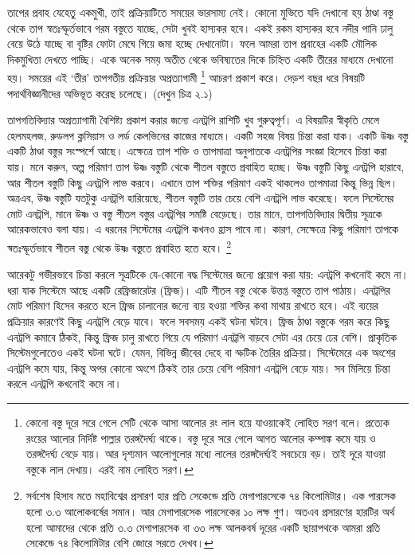 \documentclass[
]{book}
\begin{document}
তাপের প্রবাহ যেহেতু একমুখী, তাই প্রক্রিয়াটিতে সময়ের ভারসাম্য নেই। কোনো মুভিতে যদি দেখানো হয় ঠাণ্ডা বস্তু থেকে তাপ স্বতঃস্ফূর্তভাবে গরম বস্তুতে যাচ্ছে, সেটা খুবই হাস্যকর হবে। একই রকম হাস্যকর হবে নদীর পানি ঢালু বেয়ে উঠে যাচ্ছে বা বৃষ্টির ফোটা মেঘে গিয়ে জমা হচ্ছে দেখানোটা। ফলে আমরা তাপ প্রবাহের একটি মৌলিক দিকমুখিতা দেখতে পাচ্ছি। একে অনেক সময় অতীত থেকে ভবিষ্যতের দিকে চিহ্নিত একটি তীরের মাধ্যমে দেখানো হয়। সময়ের এই `তীর' তাপগতীয় প্রক্রিয়ার অপ্রত্যাগামী \footnote{কোনো বস্তু দূরে সরে গেলে সেটি থেকে আসা আলোর রং লাল হয়ে যাওয়াকেই লোহিত সরণ বলে। প্রত্যেক রংয়ের আলোর নির্দিষ্ট পাল্লার তরঙ্গদৈর্ঘ্য থাকে। বস্তু দূরে সরে গেলে আগত আলোর কম্পাঙ্ক কমে যায় ও তরঙ্গদৈর্ঘ্য বেড়ে যায়। আর দৃশ্যমান আলোগুলোর মধ্যে লালের তরঙ্গদৈর্ঘ্যই সবচেয়ে বড়। তাই দূরে যাওয়া বস্তুকে লাল দেখায়। এরই নাম লোহিত সরণ।} আচরণ প্রকাশ করে। দেড়শ বছর ধরে বিষয়টি পদার্থবিজ্ঞানীদের অভিভূত করেছ চলেছে। (দেখুন চিত্র ২.১)

তাপগতিবিদ্যার অপ্রত্যাগামী বৈশিষ্ট্য প্রকাশ করার জন্যে এনট্রপি রাশিটি খুব গুরুত্বপূর্ণ। এ বিষয়টির স্বীকৃতি মেলে হেলমহলজ, রুডলপ ক্লসিয়াস ও লর্ড কেলভিনের কাজের মাধ্যমে। একটি সহজ বিষয় চিন্তা করা যাক। একটি উষ্ণ বস্তু একটি ঠাণ্ডা বস্তুর সংস্পর্শে আছে। এক্ষেত্রে তাপ শক্তি ও তাপমাত্রা অনুপাতকে এনট্রপির সংজ্ঞা হিসেবে চিন্তা করা যায়। মনে করুন, অল্প পরিমাণ তাপ উষ্ণ বস্তুটি থেকে শীতল বস্তুতে প্রবাহিত হচ্ছে। উষ্ণ বস্তুটি কিছু এনট্রপি হারাবে, আর শীতল বস্তুটি কিছু এনট্রপি লাভ করবে। এখানে তাপ শক্তির পরিমাণ একই থাকলেও তাপমাত্রা কিন্তু ভিন্ন ছিল। অত্রএব, উষ্ণ বস্তুটি যতটুকু এনট্রপি হারিয়েছে, শীতল বস্তুটি তার চেয়ে বেশি এনট্রপি লাভ করেছে। ফলে সিস্টেমের মোট এনট্রপি, মানে উষ্ণ ও বস্তু শীতল বস্তুর এনট্রপির সমষ্টি বেড়েছে। তার মানে, তাপগতিবিদ্যার দ্বিতীয় সূত্রকে আরেকভাবেও বলা যায়। এ ধরনের সিস্টেমের এনট্রপি কখনও হ্রাস পাবে না। কারণ, সেক্ষেত্রে কিছু পরিমাণ তাপকে স্বতঃস্ফূর্তভাবে শীতল বস্তু থেকে উষ্ণ বস্তুতে প্রবাহিত হতে হবে। \footnote{সর্বশেষ হিসাব মতে মহাবিশ্বের প্রসারণ হার প্রতি সেকেন্ডে প্রতি মেগাপারসেকে ৭৪ কিলোমিটার। এক পারসেক হলো ৩.৩ আলোকবর্ষের সমান। আর মেগাপারসেক পারসেকের ১০ লক্ষ গুণ। অতএব প্রসারণের হারটির অর্থ হলো আমাদের থেকে প্রতি ৩.৩ মেগাপারসেক বা ৩৩ লক্ষ আলকবর্ষ দূরের একটি ছায়াপথকে আমরা প্রতি সেকেন্ডে ৭৪ কিলোমিটার বেশি জোরে সরতে দেখব।}

আরেকটু গভীরভাবে চিন্তা করলে সূত্রটিকে যে-কোনো বদ্ধ সিস্টেমের জন্যে প্রয়োগ করা যায়: এনট্রপি কখনোই কমে না। ধরা যাক সিস্টেমে আছে একটি রেফ্রিজারেটর (ফ্রিজ)। এটি শীতল বস্তু থেকে উত্তপ্ত বস্তুতে তাপ পাঠায়। এনট্রপির মোট পরিমাণ হিসেব করতে হলে ফ্রিজ চালানোর জন্যে ব্যয় হওয়া শক্তির কথা মাথায় রাখতে হবে। এই ব্যয়ের প্রক্রিয়ার কারণেই কিছু এনট্রপি বেড়ে যাবে। ফলে সবসময় একই ঘটনা ঘটবে। ফ্রিজ ঠাণ্ডা বস্তুকে গরম করে কিছু এনট্রপি কমাবে ঠিকই, কিন্তু ফ্রিজ চালু রাখতে গিয়ে যে পরিমাণ এনট্রপি বাড়বে সেটা এর চেয়ে ঢের বেশি। প্রাকৃতিক সিস্টেমগুলোতেও একই ঘটনা ঘটে। যেমন, বিভিন্ন জীবের দেহে বা স্ফটিক তৈরির প্রক্রিয়া। সিস্টেমেরে এক অংশের এনট্রপি কমে যায়, কিন্তু অপর কোনো অংশে ঠিকই তার চেয়ে বেশি পরিমাণ এনট্রপি বেড়ে যায়। সব মিলিয়ে চিন্তা করলে এনট্রপি কখনোই কমে না।
\end{document}
